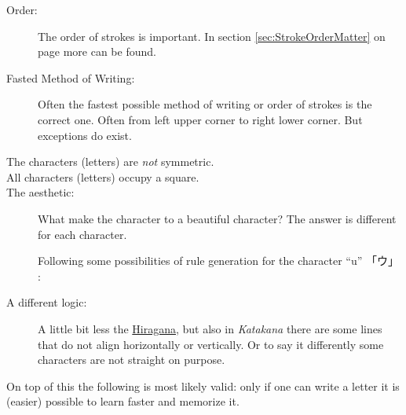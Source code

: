 \begin{description}

\item[Order:] The order of strokes is important. In section
\ref{sec:StrokeOrderMatter} on page \pageref{sec:StrokeOrderMatter} more can be
found. 

\item[Fasted Method of Writing:] Often the fastest possible method of writing
or order of strokes is the correct one.  Often from left upper corner to right
lower corner. But exceptions do exist.

\item[The characters (letters) are \textit{not} symmetric.]

\item[All characters (letters) occupy a square.]

\item[The aesthetic:] What make the character to a beautiful character? The
answer is different for each character.

Following some possibilities of rule generation for the character ``u''
 {「ウ」 }:

\bigskip {}

\bigskip {}


\bigskip {}


\bigskip {}

\bigskip

\item[A different logic:] A little bit less the
\hyperref[sec:Hiragana]{Hiragana}, but also in \textit{Katakana} there are some
lines that do not align horizontally  or vertically. Or to say it differently
some characters are not straight on purpose.

\end{description}

On top of this the following is most likely valid: only if one can write a
letter it is (easier) possible to learn faster and memorize it.


